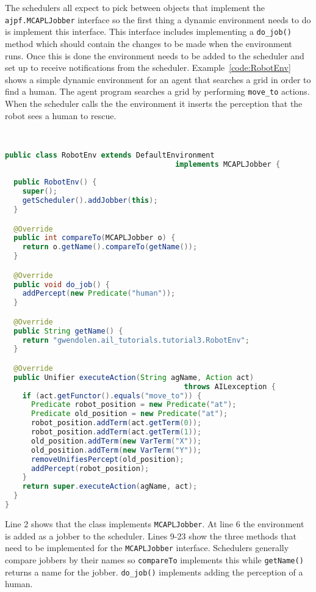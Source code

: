 \begin{sloppypar}
The schedulers all expect to pick between objects that implement the \texttt{ajpf.MCAPLJobber} interface so the first thing a dynamic environment needs to do is implement this interface.  This interface includes implementing a \texttt{do\_job()} method which should contain the changes to be made when the environment runs.  Once this is done the environment needs to be added to the scheduler and set up to receive notifications from the scheduler.  Example~\ref{code:RobotEnv} shows a simple dynamic environment for an agent that searches a grid in order to find a human.  The agent program searches a grid by performing \lstinline{move_to} actions.  When the scheduler calls the the environment it inserts the perception that the robot sees a human to rescue.  
\end{sloppypar}
\begin{ourexample}
\label{code:RobotEnv} \quad \\
\begin{lstlisting}[basicstyle=\sffamily,language=Java,style=easslisting]
public class RobotEnv extends DefaultEnvironment
                                       implements MCAPLJobber {
	
  public RobotEnv() {
    super();
    getScheduler().addJobber(this);
  }

  @Override
  public int compareTo(MCAPLJobber o) {
    return o.getName().compareTo(getName());
  }

  @Override
  public void do_job() {
    addPercept(new Predicate("human"));
  }

  @Override
  public String getName() {
    return "gwendolen.ail_tutorials.tutorial3.RobotEnv";
  }   

  @Override
  public Unifier executeAction(String agName, Action act) 
                                         throws AILexception {
    if (act.getFunctor().equals("move_to")) {
      Predicate robot_position = new Predicate("at");
      Predicate old_position = new Predicate("at");
      robot_position.addTerm(act.getTerm(0));
      robot_position.addTerm(act.getTerm(1));
      old_position.addTerm(new VarTerm("X"));
      old_position.addTerm(new VarTerm("Y"));
      removeUnifiesPercept(old_position);
      addPercept(robot_position);
    }
    return super.executeAction(agName, act);
  }
}
\end{lstlisting}
\end{ourexample}
Line 2 shows that the class implements \texttt{MCAPLJobber}.  At line 6 the environment is added as a jobber to the scheduler.  Lines 9-23 show the three methods that need to be implemented for the \texttt{MCAPLJobber} interface.  Schedulers generally compare jobbers by their names so \texttt{compareTo} implements this while \texttt{getName()} returns a name for the jobber.  \texttt{do\_job()} implements adding the perception of a human.

